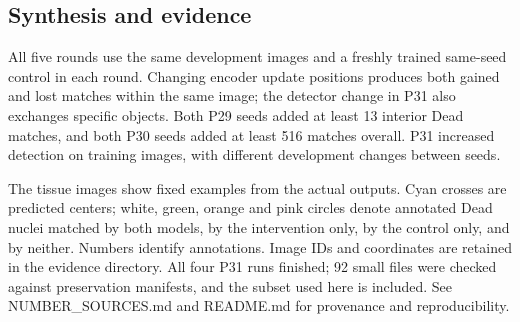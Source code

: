\documentclass[
  11pt,
]{article}
\begin{document}
\subsection{Synthesis and evidence}\label{synthesis-and-evidence}

All five rounds use the same development images and a freshly trained
same-seed control in each round. Changing encoder update positions
produces both gained and lost matches within the same image; the
detector change in P31 also exchanges specific objects. Both P29 seeds
added at least 13 interior Dead matches, and both P30 seeds added at
least 516 matches overall. P31 increased detection on training images,
with different development changes between seeds.

The tissue images show fixed examples from the actual outputs. Cyan
crosses are predicted centers; white, green, orange and pink circles
denote annotated Dead nuclei matched by both models, by the intervention
only, by the control only, and by neither. Numbers identify annotations.
Image IDs and coordinates are retained in the evidence directory. All
four P31 runs finished; 92 small files were checked against preservation
manifests, and the subset used here is included. See NUMBER\_SOURCES.md
and README.md for provenance and reproducibility.
\end{document}
